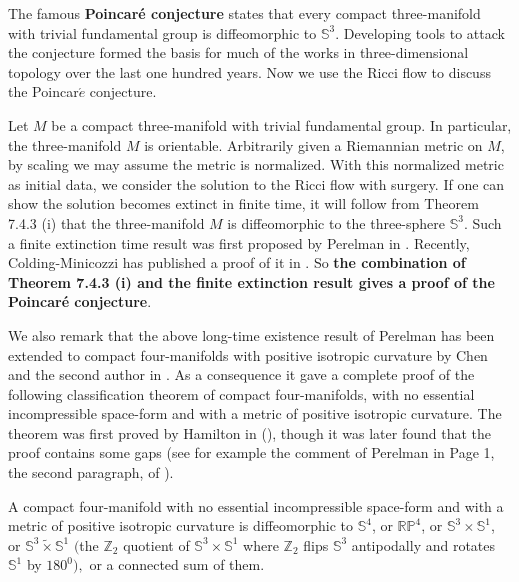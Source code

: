 The famous \textbf{Poincar\'{e} conjecture} states that every compact three-manifold with trivial
fundamental group is diffeomorphic to $\mathbb{S}^3$. Developing
tools to attack the conjecture formed the basis for much of the
works in three-dimensional topology over the last one hundred
years. Now we use the Ricci flow to discuss the Poincar$\acute{e}$
conjecture.

Let $M$ be a compact three-manifold with trivial fundamental
group. In particular, the three-manifold $M$ is orientable.
Arbitrarily given a Riemannian metric on $M$, by scaling we may
assume the metric is normalized. With this normalized metric as
initial data, we consider the solution to the Ricci flow with
surgery. If one can show the solution becomes extinct in finite
time, it will follow from Theorem 7.4.3 (i) that the
three-manifold $M$ is diffeomorphic to the three-sphere
$\mathbb{S}^3$. Such a finite extinction time result was first
proposed by Perelman in \cite{P3}. Recently, Colding-Minicozzi has
published a proof of it in \cite{CM}. So \textbf{the combination
of Theorem 7.4.3 (i) and the finite extinction result \cite{P3,
CM} gives a proof of the Poincar\'{e} conjecture}.

We also remark that the above long-time existence result of
Perelman has been extended to compact four-manifolds with positive
isotropic curvature by Chen and the second author in \cite{CZ05F}.
As a consequence it gave a complete proof of the following
classification theorem of compact four-manifolds, with no
essential incompressible space-form and with a metric of positive
isotropic curvature. The theorem was first proved by Hamilton in
(\cite{Ha97}), though it was later found that the proof contains
some gaps (see for example the comment of Perelman in Page 1, the
second paragraph, of \cite{P2}).

\begin{theorem}
  \label{thm:cz-positive-isotropic-curvature-four-manifold-classification}

A compact four-manifold with no essential incompressible
space-form and with a metric of positive isotropic curvature is
diffeomorphic to $\mathbb{S}^4$, or $\mathbb{RP}^4$, or
$\mathbb{S}^3\times \mathbb{S}^1$, or
$\mathbb{S}^3\widetilde{\times}\mathbb{S}^1$ $($the $\mathbb{Z}_2$
quotient of $\mathbb{S}^{3}\times \mathbb{S}^{1}$ where
$\mathbb{Z}_{2}$ flips $\mathbb{S}^{3}$ antipodally and rotates
$\mathbb{S}^{1}$ by $180^{0}),$ or a connected sum of them.
\end{theorem}


